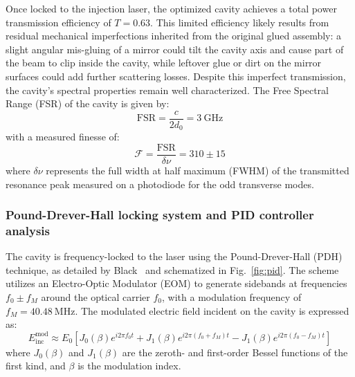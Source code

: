Once locked to the injection laser, the optimized cavity achieves a total power
transmission efficiency of $T = 0.63$. This limited efficiency likely results from
residual mechanical imperfections inherited from the original glued assembly: a slight
angular mis-gluing of a mirror could tilt the cavity axis and cause part of the beam to
clip inside the cavity, while leftover glue or dirt on the mirror surfaces could add
further scattering losses. Despite this imperfect transmission, the cavity's spectral
properties remain well characterized. The Free Spectral Range (FSR) of the cavity is
given by:
\begin{equation}
\text{FSR} = \frac{c}{2 d_0} = 3~\text{GHz}
\end{equation}
with a measured finesse of:
\begin{equation}
\mathcal{F} = \frac{\text{FSR}}{\delta \nu} = 310 \pm 15
\end{equation}
where $\delta \nu$ represents the full width at half maximum (FWHM) of the transmitted
resonance peak measured on a photodiode for the odd transverse modes.


\subsubsection{Pound-Drever-Hall locking system and PID controller analysis}

The cavity is frequency-locked to the laser using the Pound-Drever-Hall (PDH) technique, as detailed by Black~\cite{black_Gas_preparation_and_spin_control_2001} and schematized in Fig.~\ref{fig:pid}. The scheme utilizes an Electro-Optic Modulator (EOM) to generate sidebands at frequencies $f_0 \pm f_M$ around the optical carrier $f_0$, with a modulation frequency of $f_M = 40.48~\text{MHz}$. The modulated electric field incident on the cavity is expressed as:
\begin{equation}
E_{\text{inc}}^{\text{mod}} \approx E_0 \left[ J_0(\beta) e^{i 2\pi f_0 t} + J_1(\beta) e^{i 2\pi (f_0 + f_M) t} - J_1(\beta) e^{i 2\pi (f_0 - f_M) t} \right]
\end{equation}
where $J_0(\beta)$ and $J_1(\beta)$ are the zeroth- and first-order Bessel functions of the first kind, and $\beta$ is the modulation index.


